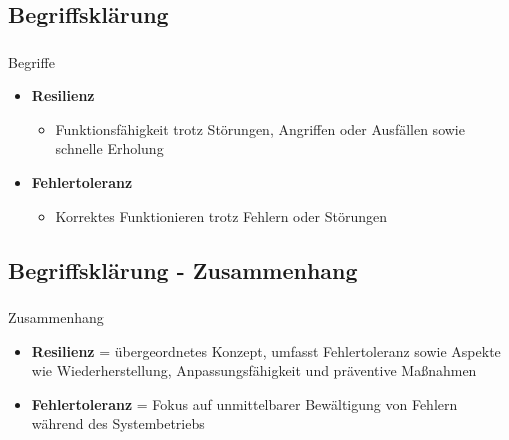 \subsection{Begriffsklärung}

\begin{frame}
    \frametitle{\insertsection}
    \framesubtitle{\insertsubsection}

    \begin{block}{Begriffe}
        \begin{itemize}
            \item \textbf{Resilienz}
                \begin{itemize}
                     \item Funktionsfähigkeit trotz Störungen, Angriffen oder Ausfällen sowie schnelle Erholung\\
                \end{itemize}
            \item \textbf{Fehlertoleranz}
                \begin{itemize}
                    \item Korrektes Funktionieren trotz Fehlern oder Störungen
                \end{itemize}
        \end{itemize}
    \end{block}
\end{frame}


\subsection{Begriffsklärung - Zusammenhang}

\begin{frame}
    \frametitle{\insertsection}
    \framesubtitle{\insertsubsection}

    \begin{block}{Zusammenhang}
        \begin{itemize}
            \item \textbf{Resilienz} = übergeordnetes Konzept, umfasst Fehlertoleranz sowie Aspekte wie Wiederherstellung, Anpassungsfähigkeit und präventive Maßnahmen\\
            \item \textbf{Fehlertoleranz} = Fokus auf unmittelbarer Bewältigung von Fehlern während des Systembetriebs
        \end{itemize}
    \end{block}
\end{frame}

